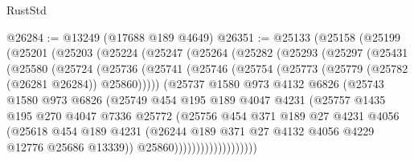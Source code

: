 \begin{lexlean}{RustStd}
\begin{coremodule}
@26284 := @13249 (@17688 @189 @4649)
@26351 := @25133
    (@25158
      (@25199
        (@25201
          (@25203
            (@25224
              (@25247
                (@25264
                  (@25282
                    (@25293
                      (@25297
                        (@25431
                          (@25580
                            (@25724
                              (@25736
                                (@25741
                                  (@25746
                                    (@25754 (@25773 (@25779 (@25782 (@26281 @26284)) @25860)))))
                                (@25737
                                  @1580
                                  @973
                                  @4132
                                  @6826
                                  (@25743
                                    @1580
                                    @973
                                    @6826
                                    (@25749
                                      @454
                                      @195
                                      @189
                                      @4047
                                      @4231
                                      (@25757
                                        @1435
                                        @195
                                        @270
                                        @4047
                                        @7336
                                        @25772
                                        (@25756
                                          @454
                                          @371
                                          @189
                                          @27
                                          @4231
                                          @4056
                                          (@25618
                                            @454
                                            @189
                                            @4231
                                            (@26244
                                              @189
                                              @371
                                              @27
                                              @4132
                                              @4056
                                              @4229
                                              @12776
                                              @25686
                                              @13339))
                                          @25860)))))))))))))))))))

\end{coremodule}
\end{lexlean}
